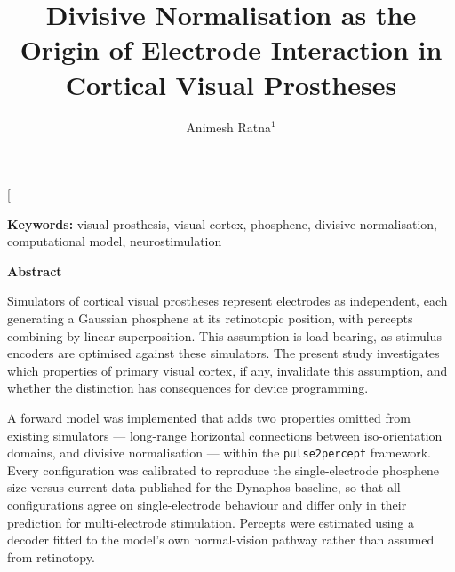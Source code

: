 \documentclass[10pt,twocolumn]{article}
\title{\bfseries Divisive Normalisation as the Origin of Electrode
Interaction in Cortical Visual Prostheses}
\author{\normalsize Animesh Ratna$^{1}$}
\date{}
\newcommand{\pptwo}{\texttt{pulse2percept}}
\begin{document}
\twocolumn[
  \begin{@twocolumnfalse}
    \maketitle
    \vspace{-1.2em}

    \begin{center}
    \begin{minipage}{0.92\textwidth}
    \small
    \noindent\textbf{Keywords:} visual prosthesis, visual cortex, phosphene,
    divisive normalisation, computational model, neurostimulation

    \bigskip
    \begin{center}\textbf{\normalsize Abstract}\end{center}

    \noindent Simulators of cortical visual prostheses
    represent electrodes as independent, each generating a Gaussian
    phosphene at its retinotopic position, with percepts combining by linear
    superposition. This assumption is load-bearing, as stimulus encoders are
    optimised against these simulators. The present study investigates which
    properties of primary visual cortex, if any, invalidate this assumption,
    and whether the distinction has consequences for device programming.

    \smallskip
    \noindent A forward model was implemented that adds
    two properties omitted from existing simulators --- long-range
    horizontal connections between iso-orientation domains, and divisive
    normalisation --- within the \pptwo{} framework. Every configuration was
    calibrated to reproduce the single-electrode phosphene
    size-versus-current data published for the Dynaphos baseline, so that
    all configurations agree on single-electrode behaviour and differ only
    in their prediction for multi-electrode stimulation. Percepts were
    estimated using a decoder fitted to the model's own normal-vision
    pathway rather than assumed from retinotopy.


\end{minipage}
\end{center}
\end{@twocolumnfalse}
\end{document}

